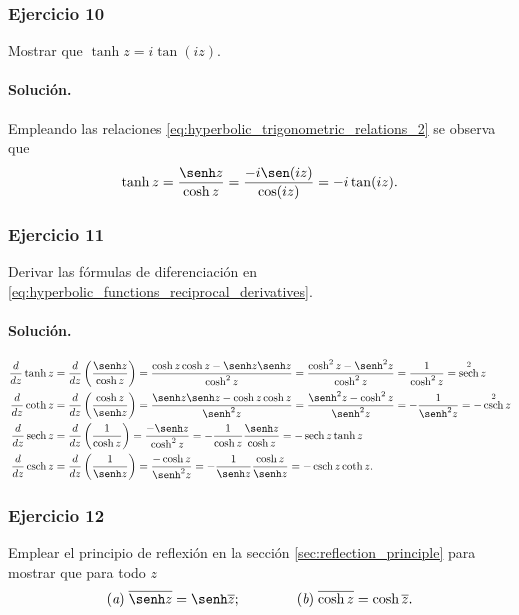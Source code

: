\documentclass[a4paper]{report}
\DeclareMathOperator{\sech}{sech}
\DeclareMathOperator{\csch}{csch}
\begin{document}
\subsubsection{Ejercicio 10}

Mostrar que \(\tanh z=i\tan(iz)\).

\paragraph{Solución.} Empleando las relaciones \ref{eq:hyperbolic_trigonometric_relations_2} se observa que 
\[
 \tanh z=\frac{\senh z}{\cosh z}=\frac{-i\sen(iz)}{\cos(iz)}=-i\tan(iz).
\]

\subsubsection{Ejercicio 11}

Derivar las fórmulas de diferenciación en \ref{eq:hyperbolic_functions_reciprocal_derivatives}.

\paragraph{Solución.} 
\begin{align*}
  \frac{d}{dz}\tanh z&=\frac{d}{dz}\left(\frac{\senh z}{\cosh z}\right)=\frac{\cosh z\cosh z-\senh z\senh z}{\cosh^2z}=\frac{\cosh^2z-\senh^2z}{\cosh^2z}=\frac{1}{\cosh^2z}=\sech^2z\\
  \frac{d}{dz}\coth z&=\frac{d}{dz}\left(\frac{\cosh z}{\senh z}\right)=\frac{\senh z\senh z-\cosh z\cosh z}{\senh^2z}=\frac{\senh^2z-\cosh^2z}{\senh^2z}=-\frac{1}{\senh^2z}=-\csch^2z\\ 
  \frac{d}{dz}\sech z&=\frac{d}{dz}\left(\frac{1}{\cosh z}\right)=\frac{-\senh z}{\cosh^2z}=-\frac{1}{\cosh z}\frac{\senh z}{\cosh z}=-\sech z\tanh z\\
  \frac{d}{dz}\csch z&=\frac{d}{dz}\left(\frac{1}{\senh z}\right)=\frac{-\cosh z}{\senh^2z}=-\frac{1}{\senh z}\frac{\cosh z}{\senh z}=-\csch z\coth z. 
\end{align*}

\subsubsection{Ejercicio 12}

Emplear el principio de reflexión en la sección \ref{sec:reflection_principle} para mostrar que para todo \(z\)
\[
 (\textit{a})\;\overline{\senh z}=\senh\overline{z};\qquad\qquad (\textit{b})\;\overline{\cosh z}=\cosh\overline{z}.
\]
\end{document}
